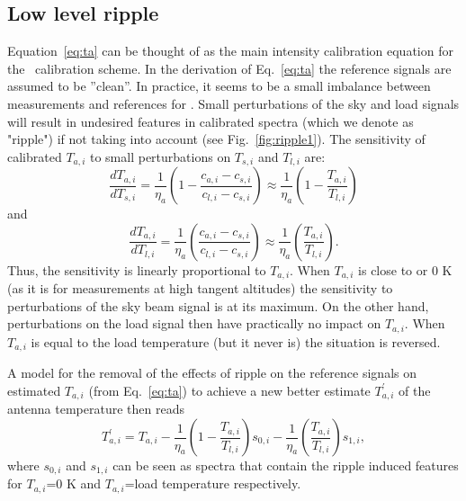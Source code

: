 \subsection{Low level ripple}
\label{sec:ripples}
Equation~\ref{eq:ta} can be thought of as the main intensity
calibration equation for the \smr\ calibration scheme.
In the derivation of Eq.~\ref{eq:ta}
the reference signals are assumed to be ''clean''.
In practice, it seems to be a small imbalance between 
measurements and references for \smr. 
Small perturbations of the sky and load signals will
result in undesired features in calibrated
spectra (which we denote as "ripple") 
if not taking into account (see Fig.~\ref{fig:ripple1}).
The sensitivity of calibrated \(T_{a,i}\) 
to small perturbations on \(T_{s,i}\) and \(T_{l,i}\) are:
\begin{equation}
\frac{dT_{a,i}}{dT_{s,i}}=\frac{1}{\eta_{a}}\left(1-\frac{c_{a,i}-c_{s,i}}{c_{l,i}-c_{s,i}}\right)\approx \frac{1}{\eta_{a}}\left(1-\frac{T_{a,i}}{T_{l,i}}\right)
\end{equation}
and
\begin{equation}
\frac{dT_{a,i}}{dT_{l,i}}=\frac{1}{\eta_{a}}\left(\frac{c_{a,i}-c_{s,i}}{c_{l,i}-c_{s,i}}\right)\approx \frac{1}{\eta_{a}}\left(\frac{T_{a,i}}{T_{l,i}}\right).
\end{equation}
Thus, the sensitivity is linearly proportional to \(T_{a,i}\).
When \(T_{a,i}\) is close to or 0 K (as it is for measurements at high
tangent altitudes) the sensitivity to perturbations of
the sky beam signal is at its maximum.
On the other hand, perturbations on the load signal then have practically
no impact on \(T_{a,i}\).
When \(T_{a,i}\) is equal to the load temperature (but it never is)
the situation is reversed.

A model for the removal of the effects of ripple on the reference signals
on estimated \(T_{a,i}\) (from Eq.~\ref{eq:ta}) to achieve a new
better estimate \(T^{'}_{a,i}\) of the antenna temperature then reads
\begin{equation}
\label{correction}
T^{'}_{a,i}=T_{a,i}-\frac{1}{\eta_{a}}\left(1-\frac{T_{a,i}}{T_{l,i}}\right) s_{0,i}-
 \frac{1}{\eta_{a}}\left(\frac{T_{a,i}}{T_{l,i}}\right) s_{1,i},
\end{equation}
where \(s_{0,i}\) and \(s_{1,i}\) can be seen as spectra that contain
the ripple induced features for \(T_{a,i}\)=0 K and \(T_{a,i}\)=load temperature
respectively.

